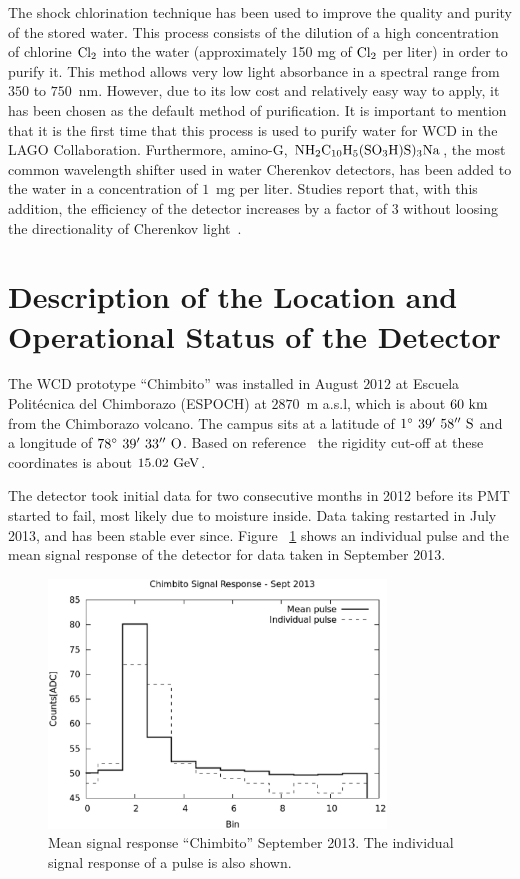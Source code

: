 \documentclass[12pt]{article}
\begin{document}
The shock chlorination technique has been used to improve the quality and purity of the stored water. This process consists of the dilution of a high concentration of chlorine ${\rm  Cl_{2}}$ into the water (approximately 150 mg of ${\rm Cl_{2}}$ per liter) in order to purify it. This method allows very low light absorbance in a spectral range from $350$ to $750$~nm. However, due to its low cost and relatively easy way to apply, it has been chosen as the default method of purification. It is important to mention that it is the first time that this process is used to purify water for WCD in the LAGO Collaboration. Furthermore, amino-G, ${\rm NH_{2}C_{10}H_{5}(SO_{3}H)S)_{3}Na}$, the most common wavelength shifter used in water Cherenkov detectors, has been added to the water in a concentration of $1$~mg per liter. Studies report that, with this addition, the efficiency of the detector increases by a factor of $3$ without loosing the directionality of Cherenkov light~\cite{Badino:1981ps}.

\section{Description of the Location and Operational Status of the Detector}

The WCD prototype ``Chimbito'' was installed in August $2012$ at Escuela Polit\'{e}cnica del Chimborazo (ESPOCH) at $2870$~m a.s.l, which is about $60\ {\rm km}$ from the Chimborazo volcano. The campus sits at a latitude of ${1^{\circ}\  39'\ 58''\ {\rm S}}$ and a longitude of ${78^{\circ}\  39'\ 33''\ {\rm O}}$. Based on reference~\cite{rigidity} the rigidity cut-off at these coordinates is about ${15.02\ {\rm GeV}}$.

The detector took initial data for two consecutive months in 2012 before its PMT started to fail, most likely due to moisture inside. Data taking restarted in July 2013, and has been stable ever since. Figure ~\ref{fig:pulse} shows an individual pulse and the mean signal response of the detector for data taken in September 2013.

 \begin{figure}[!ht]
  \centering
 \includegraphics[width=0.8\textwidth]{promedioSep21h.eps}
  \caption{Mean signal response ``Chimbito'' September 2013. The individual signal response of a pulse is also shown.}
  \label{fig:pulse}
 \end{figure}
\end{document}

